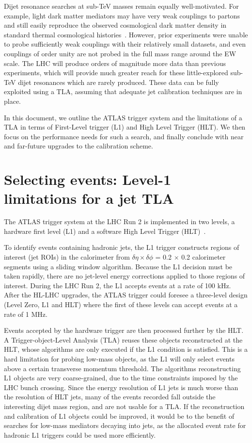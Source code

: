 \documentclass[a4paper,justified]{tufte-handout}
\begin{document}
Dijet resonance searches at sub-TeV masses remain equally well-motivated. For example, light dark matter mediators may have very weak couplings to partons and still easily reproduce the observed cosmological dark matter density in standard thermal cosmological histories~\cite{Chala:2015ama}. However, prior experiments were unable to probe sufficiently weak couplings with their relatively small datasets, and even couplings of order unity are not probed in the full mass range around the EW scale. The LHC will produce orders of magnitude more data than previous experiments, which will provide much greater reach  for these little-explored sub-TeV dijet resonances which are rarely produced. These data can be fully exploited using a TLA, assuming that adequate jet calibration techniques are in place. %

In this document, we outline the ATLAS trigger system and the limitations of a TLA in terms of First-Level trigger (L1)  and High Level Trigger (HLT). We then focus on the performance needs for such a search, and finally conclude with near and far-future upgrades to the calibration scheme. 

\section{Selecting events: Level-1 limitations for a jet TLA} \label{sec:L1Limitations}

The ATLAS trigger system at the LHC Run 2 is implemented in two levels, a hardware first level (L1) and a software High Level Trigger (HLT)~\cite{Aaboud:2016leb}.

To identify events containing hadronic jets, the L1 trigger constructs regions of interest (jet ROIs) in the calorimeter from $ \delta\eta \times \delta\phi$ = 0.2 $\times$ 0.2 calorimeter segments using a sliding window algorithm. Because the L1 decision must be taken rapidly, there are no jet-level energy corrections applied to those regions of interest. During the LHC Run 2, the L1 accepts events at a rate of 100 kHz. After the HL-LHC upgrades, the ATLAS trigger could foresee a three-level design (Level Zero, L1 and HLT)  where the first of these levels can accept events at a rate of 1 MHz. 

Events accepted by the hardware trigger are then processed further by the HLT. A Trigger-object-Level Analysis (TLA) reuses these objects reconstructed at the HLT, whose algorithms are only executed if the L1 condition is satisfied. This is a hard limitation for probing low-mass objects, as the L1 will only select events above a certain transverse momentum threshold. The algorithms reconstructing L1 objects are very coarse-grained, due to the time constraints imposed by the LHC bunch crossing. Since the energy resolution of L1 jets is much worse than the resolution of HLT jets, many of the events recorded fall outside the interesting dijet mass region, and are not usable for a TLA. If the reconstruction and calibration of L1 objects could be improved, it would be to the benefit of searches for low-mass mediators decaying into jets, as the allocated event rate for hadronic L1 triggers could be used more efficiently. 
\end{document}
